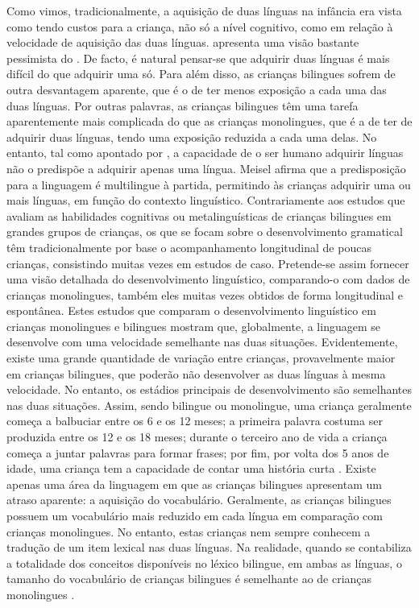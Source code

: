 \documentclass[output=paper]{LSP/langsci}
\begin{document}
Como vimos, tradicionalmente, a aquisição de duas línguas na infância era vista como tendo custos para a criança, não só a nível cognitivo, como em relação à velocidade de aquisição das duas línguas. \citet{macnamara1966} apresenta uma visão bastante pessimista do . De facto, é natural pensar-se que adquirir duas línguas é mais difícil do que adquirir uma só. Para além disso, as crianças bilingues sofrem de outra desvantagem aparente, que é o de ter menos exposição a cada uma das duas línguas. Por outras palavras, as crianças bilingues têm uma tarefa aparentemente mais complicada do que as crianças monolingues, que é a de ter de adquirir duas línguas, tendo uma exposição reduzida a cada uma delas. No entanto, tal como apontado por \citet{meisel2004}, a capacidade de o ser humano adquirir línguas não o predispõe a adquirir apenas uma língua. Meisel afirma que a predisposição para a linguagem é multilingue à partida, permitindo às crianças adquirir uma ou mais línguas, em função do contexto linguístico. Contrariamente aos estudos que avaliam as habilidades cognitivas ou metalinguísticas de crianças bilingues em grandes grupos de crianças, os que se focam sobre o desenvolvimento gramatical têm tradicionalmente por base o acompanhamento longitudinal de poucas crianças, consistindo muitas vezes em estudos de caso. Pretende-se assim fornecer uma visão detalhada do desenvolvimento linguístico, comparando-o com dados de crianças monolingues, também eles muitas vezes obtidos de forma longitudinal e espontânea. Estes estudos que comparam o desenvolvimento linguístico em crianças monolingues e bilingues mostram que, globalmente, a linguagem se desenvolve com uma velocidade semelhante nas duas situações. Evidentemente, existe uma grande quantidade de variação entre crianças, provavelmente maior em crianças bilingues, que poderão não desenvolver as duas línguas à mesma velocidade. No entanto, os estádios principais de desenvolvimento são semelhantes nas duas situações. Assim, sendo bilingue ou monolingue, uma criança geralmente começa a balbuciar entre os 6 e os 12 meses; a primeira palavra costuma ser produzida entre os 12 e os 18 meses; durante o terceiro ano de vida a criança começa a juntar palavras para formar frases; por fim, por volta dos 5 anos de idade, uma criança tem a capacidade de contar uma história curta \citep{dehouwer2009}. Existe apenas uma área da linguagem em que as crianças bilingues apresentam um atraso aparente: a aquisição do vocabulário. Geralmente, as crianças bilingues possuem um vocabulário mais reduzido em cada língua em comparação com crianças monolingues. No entanto, estas crianças nem sempre conhecem a tradução de um item lexical nas duas línguas. Na realidade, quando se contabiliza a totalidade dos conceitos disponíveis no léxico bilingue, em ambas as línguas, o tamanho do vocabulário de crianças bilingues é semelhante ao de crianças monolingues \citep{pearson2009}. 
\end{document}
